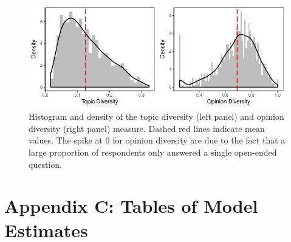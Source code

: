 \documentclass[12pt]{article}
\begin{document}
\begin{figure}[h]\centering
\includegraphics{../fig/yg_diversity.pdf}
\caption{Histogram and density of the topic diversity (left panel) and opinion diversity (right panel) measure. Dashed red lines indicate mean values. The spike at 0 for opinion diversity are due to the fact that a large proportion of respondents only answered a single open-ended question.}\label{fig:yg_diversity}
\end{figure}




\clearpage
\section*{Appendix C: Tables of Model Estimates}
\renewcommand\thefigure{C.\arabic{figure}}
\renewcommand\thetable{C.\arabic{table}}
\setcounter{figure}{0}
\setcounter{table}{0}









\end{document}

